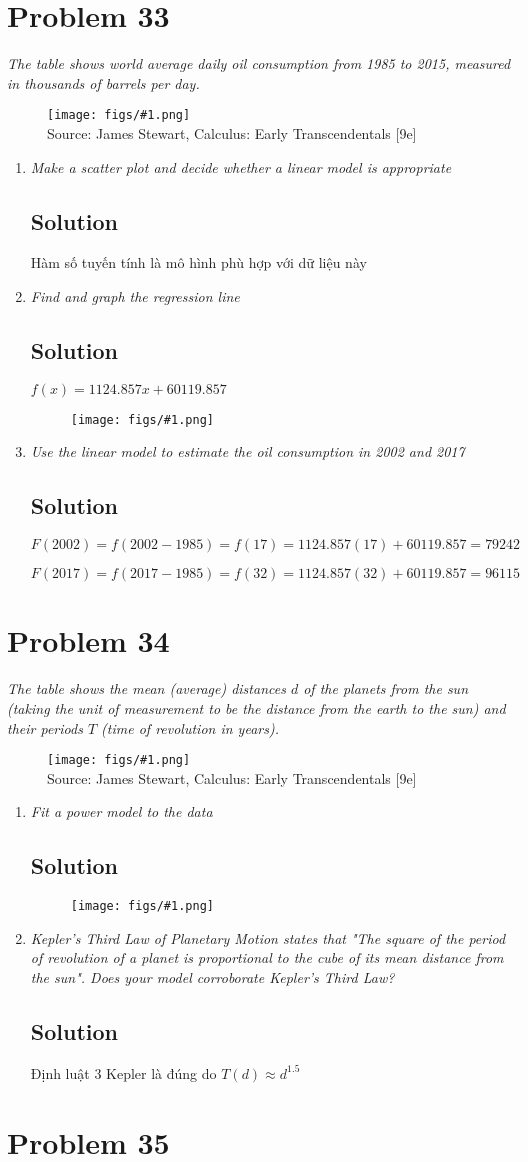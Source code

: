 \documentclass[11pt]{article}
\newcommand{\soln}{\subsection*}
\newcommand{\qn}{\textit}
\newcommand{\imagesource}[1]{{\footnotesize Source: #1}}
\newcommand{\imgqn}[1]{
	\begin{figure}[H]
		\centering
		\texttt{[image: figs/\#1.png]}\\
		\imagesource{James Stewart, Calculus: Early Transcendentals [9e]}
	\end{figure}
}
\newcommand{\imgsoln}[1]{
	\begin{figure}[H]
		\centering
		\texttt{[image: figs/\#1.png]}
	\end{figure}
}
\begin{document}
\section*{Problem 33}

\qn{The table shows world average daily oil consumption from 1985 to 2015, measured in thousands of barrels per day.}

\imgqn{1.2.33}

\begin{enumerate}
	\item \qn{Make a scatter plot and decide whether a linear model is appropriate}
	\soln{Solution}
	Hàm số tuyến tính là mô hình phù hợp với dữ liệu này
	
	\item \qn{Find and graph the regression line}
	\soln{Solution}
	$f(x)=1124.857x+60119.857$
	\imgsoln{1.2.33-ans.a}
	
	\item \qn{Use the linear model to estimate the oil consumption in 2002 and 2017}
	\soln{Solution}
	$F(2002)=f(2002-1985)=f(17)=1124.857(17)+60119.857=79242$
	
	$F(2017)=f(2017-1985)=f(32)=1124.857(32)+60119.857=96115$
\end{enumerate}

\section*{Problem 34}

\qn{The table shows the mean (average) distances $d$ of the planets from the sun (taking the unit of measurement to be the distance from the earth to the sun) and their periods $T$ (time of revolution in years).}

\imgqn{1.2.34}

\begin{enumerate}
	\item \qn{Fit a power model to the data}
	\soln{Solution}
	\imgsoln{1.2.34-ans.a}
	
	\item \qn{Kepler's Third Law of Planetary Motion states that "The square of the period of revolution of a planet is proportional to the cube of its mean distance from the sun". Does your model corroborate Kepler's Third Law?}
	\soln{Solution}
	Định luật 3 Kepler là đúng do $T(d) \approx d^{1.5}$
\end{enumerate}

\section*{Problem 35}
\end{document}
